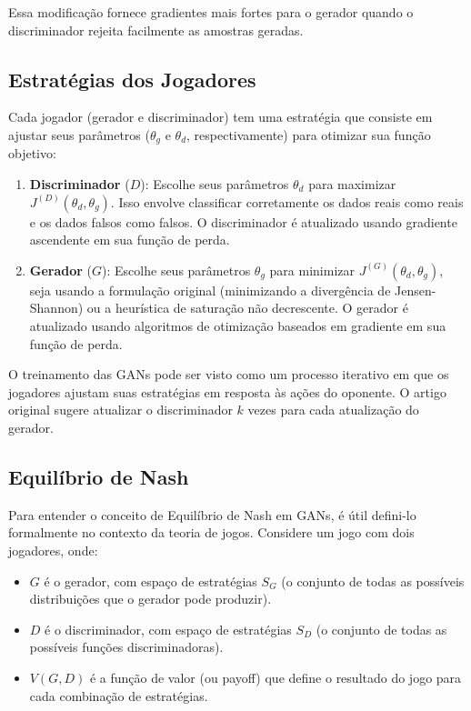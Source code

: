 \documentclass[a4paper]{tufte-handout}
\begin{document}
Essa modificação fornece gradientes mais fortes para o gerador quando o discriminador rejeita facilmente as amostras geradas.

\subsection{Estratégias dos Jogadores}

Cada jogador (gerador e discriminador) tem uma estratégia que consiste em ajustar seus parâmetros ($\theta_g$ e $\theta_d$, respectivamente) para otimizar sua função objetivo:

\begin{enumerate}
    \item \textbf{Discriminador} ($D$): Escolhe seus parâmetros $\theta_d$ para maximizar $J^{(D)}(\theta_d, \theta_g)$. Isso envolve classificar corretamente os dados reais como reais e os dados falsos como falsos. O discriminador é atualizado usando gradiente ascendente em sua função de perda.
    \item \textbf{Gerador} ($G$): Escolhe seus parâmetros $\theta_g$ para minimizar $J^{(G)}(\theta_d, \theta_g)$, seja usando a formulação original (minimizando a divergência de Jensen-Shannon) ou a heurística de saturação não decrescente. O gerador é atualizado usando algoritmos de otimização baseados em gradiente em sua função de perda.
\end{enumerate}

O treinamento das GANs pode ser visto como um processo iterativo em que os jogadores ajustam suas estratégias em resposta às ações do oponente. O artigo original sugere atualizar o discriminador $k$ vezes para cada atualização do gerador.

\subsection{Equilíbrio de Nash}

Para entender o conceito de Equilíbrio de Nash em GANs, é útil defini-lo formalmente no contexto da teoria de jogos. Considere um jogo com dois jogadores, onde:

\begin{itemize}
    \item $G$ é o gerador, com espaço de estratégias $S_G$ (o conjunto de todas as possíveis distribuições que o gerador pode produzir).
    \item $D$ é o discriminador, com espaço de estratégias $S_D$ (o conjunto de todas as possíveis funções discriminadoras).
    \item $V(G, D)$ é a função de valor (ou payoff) que define o resultado do jogo para cada combinação de estratégias.
\end{itemize}
\end{document}

